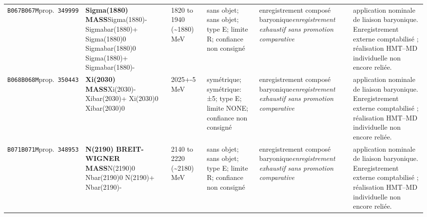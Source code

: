 \begin{landscape}
\begin{longtable}{L{1.85cm}L{4.45cm}L{2.35cm}L{4.05cm}L{3.35cm}L{7.15cm}}
\texttt{B067}\newline \texttt{B067M}\newline prop.\ \texttt{349999} & \textbf{Sigma(1880) MASS}\newline Sigma(1880)- \textbar{}\allowbreak{} Sigmabar(1880)+ \textbar{}\allowbreak{} Sigma(1880)0 \textbar{}\allowbreak{} Sigmabar(1880)0 \textbar{}\allowbreak{} Sigma(1880)+ \textbar{}\allowbreak{} Sigmabar(1880)- & 1820 to 1940 (\textasciitilde{}1880)\,MeV & sans objet; sans objet; type E; limite R; confiance non consigné & enregistrement composé baryonique\newline \emph{enregistrement exhaustif sans promotion comparative} & application nominale de liaison baryonique. Enregistrement externe comptabilisé ; réalisation HMT--MD individuelle non encore reliée. \\
\texttt{B068}\newline \texttt{B068M}\newline prop.\ \texttt{350443} & \textbf{Xi(2030) MASS}\newline Xi(2030)- \textbar{}\allowbreak{} Xibar(2030)+ \textbar{}\allowbreak{} Xi(2030)0 \textbar{}\allowbreak{} Xibar(2030)0 & 2025+-5\,MeV & symétrique; symétrique: ±5; type E; limite NONE; confiance non consigné & enregistrement composé baryonique\newline \emph{enregistrement exhaustif sans promotion comparative} & application nominale de liaison baryonique. Enregistrement externe comptabilisé ; réalisation HMT--MD individuelle non encore reliée. \\
\texttt{B071}\newline \texttt{B071M}\newline prop.\ \texttt{348953} & \textbf{N(2190) BREIT-WIGNER MASS}\newline N(2190)0 \textbar{}\allowbreak{} Nbar(2190)0 \textbar{}\allowbreak{} N(2190)+ \textbar{}\allowbreak{} Nbar(2190)- & 2140 to 2220 (\textasciitilde{}2180)\,MeV & sans objet; sans objet; type E; limite R; confiance non consigné & enregistrement composé baryonique\newline \emph{enregistrement exhaustif sans promotion comparative} & application nominale de liaison baryonique. Enregistrement externe comptabilisé ; réalisation HMT--MD individuelle non encore reliée. \\

\end{longtable}
\end{landscape}

